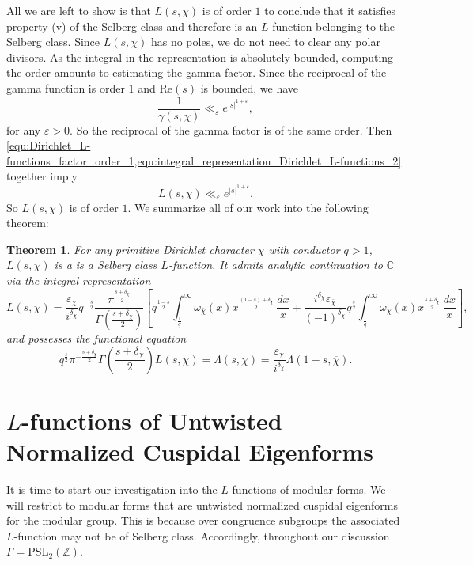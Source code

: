 \documentclass[12pt]{book}
\newtheorem{theorem}{Theorem}[section]
\theoremstyle{definition}\newframedtheorem{method}{Method}
\newcommand{\PSL}{\mathrm{PSL}}
\newcommand{\Z}{\mathbb{Z}}
\newcommand{\C}{\mathbb{C}}
\newcommand{\g}{\gamma}
\renewcommand{\d}{\delta}
\newcommand{\w}{\omega}
\newcommand{\G}{\Gamma}
\renewcommand{\L}{\Lambda}
\newcommand{\e}{\varepsilon}
\newcommand{\<}{\langle}
\renewcommand{\>}{\rangle}
\newcommand{\conj}{\overline}
\newcommand{\cchi}{\conj{\chi}}
\renewcommand{\Re}{\mathrm{Re}}
\begin{document}
      All we are left to show is that $L(s,\chi)$ is of order $1$ to conclude that it satisfies property (v) of the Selberg class and therefore is an $L$-function belonging to the Selberg class. Since $L(s,\chi)$ has no poles, we do not need to clear any polar divisors. As the integral in the representation is absolutely bounded, computing the order amounts to estimating the gamma factor. Since the reciprocal of the gamma function is order $1$ and $\Re(s)$ is bounded, we have
      \begin{equation}\label{equ:Dirichlet_L-functions_factor_order_1}
        \frac{1}{\g(s,\chi)} \ll_{\e} e^{|s|^{1+\e}},
      \end{equation}
      for any $\e > 0$. So the reciprocal of the gamma factor is of the same order. Then \cref{equ:Dirichlet_L-functions_factor_order_1,equ:integral_representation_Dirichlet_L-functions_2} together imply
      \[
        L(s,\chi) \ll_{\e} e^{|s|^{1+\e}}.
      \]
      So $L(s,\chi)$ is of order $1$. We summarize all of our work into the following theorem:

      \begin{theorem}
        For any primitive Dirichlet character $\chi$ with conductor $q > 1$, $L(s,\chi)$ is a is a Selberg class $L$-function. It admits analytic continuation to $\C$ via the integral representation
        \[
          L(s,\chi) = \frac{\e_{\chi}}{i^{\d_{\chi}}}q^{-\frac{s}{2}}\frac{\pi^{\frac{s+\d_{\chi}}{2}}}{\G\left(\frac{s+\d_{\chi}}{2}\right)}\left[q^{\frac{1-s}{2}}\int_{\frac{1}{q}}^{\infty}\w_{\cchi}(x)x^{\frac{(1-s)+\d_{\chi}}{2}}\,\frac{dx}{x}+\frac{i^{\d_{\chi}}\e_{\cchi}}{(-1)^{\d_{\chi}}}q^{\frac{s}{2}}\int_{\frac{1}{q}}^{\infty}\w_{\chi}(x)x^{\frac{s+\d_{\chi}}{2}}\,\frac{dx}{x}\right],
        \]
        and possesses the functional equation
        \[
          q^{\frac{s}{2}}\pi^{-\frac{s+\d_{\chi}}{2}}\G\left(\frac{s+\d_{\chi}}{2}\right)L(s,\chi) = \L(s,\chi) = \frac{\e_{\chi}}{i^{\d_{\chi}}}\L(1-s,\cchi).
        \]
      \end{theorem}
  \section{\texorpdfstring{$L$}{L}-functions of Untwisted Normalized Cuspidal Eigenforms}
    It is time to start our investigation into the $L$-functions of modular forms. We will restrict to modular forms that are untwisted normalized cuspidal eigenforms for the modular group. This is because over congruence subgroups the associated $L$-function may not be of Selberg class. Accordingly, throughout our discussion $\G = \PSL_{2}(\Z)$.
\end{document}
